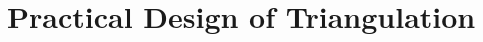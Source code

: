 \documentclass[acmsmall,screen,nonacm]{acmart}
\begin{document}







\section{Practical Design of Triangulation}
\label{sec:practical}
\end{document}

